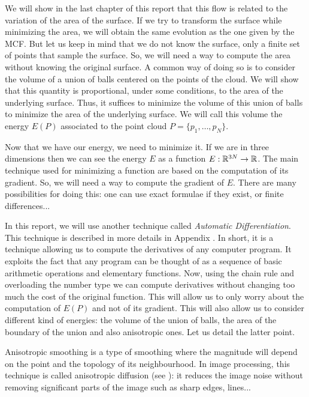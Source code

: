 We will show in the last chapter of this report that this flow is related to the
variation of the area of the surface. If we try to transform the surface while
minimizing the area, we will obtain the same evolution as the one given by the
MCF. But let us keep in mind that we do not know the surface, only a finite set
of points that sample the surface. So, we will need a way to compute the area
without knowing the original surface. A common way of doing so is to consider
the volume of a union of balls centered on the points of the cloud.  We will
show that this quantity is proportional, under some conditions, to the area of
the underlying surface. Thus, it suffices to minimize the volume of this union
of balls to minimize the area of the underlying surface. We will call this
volume the energy $ E(P) $ associated to the point cloud $ P = \{ p_1, \ldots,
p_N \} $.

Now that we have our energy, we need to minimize it. If we are in three
dimensions then we can see the energy $ E $ as a function $ E : \mathbb{R}^{3N} \to \mathbb{R}
$. The main technique used for minimizing a function are based on the
computation of its gradient. So, we will need a way to compute the gradient of $
E $. There are many possibilities for doing this: one can use exact formulae if
they exist, or finite differences...

In this report, we will use another technique called \textit{Automatic
    Differentiation}. This technique is described in more details in Appendix
. In short, it is a technique allowing us to compute
the derivatives of any computer program. It exploits the fact that any program
can be thought of as a sequence of basic arithmetic operations and elementary
functions. Now, using the chain rule and overloading the number type we can
compute derivatives without changing too much the cost of the original function.
This will allow us to only worry about the computation of $ E(P) $ and not of
its gradient. This will also allow us to consider different kind of energies:
the volume of the union of balls, the area of the boundary of the union and also
anisotropic ones. Let us detail the latter point.

Anisotropic smoothing is a type of smoothing where the magnitude will depend on
the point and the topology of its neighbourhood. In image processing, this
technique is called anisotropic diffusion (see \cite{weickert1998anisotropic}):
it reduces the image noise without removing significant parts of the image such
as sharp edges, lines...

